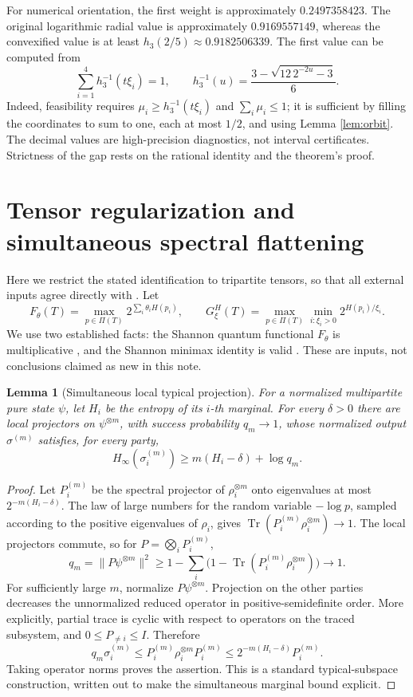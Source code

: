 \documentclass[11pt,a4paper]{article}
\newtheorem{lemma}[theorem]{Lemma}
\newcommand{\Tr}{\operatorname{Tr}}
\newcommand{\Hinf}{H_{\infty}}
\begin{document}
For numerical orientation, the first weight is approximately
\(0.2497358423\). The original logarithmic radial value is
approximately \(0.9169557149\), whereas the convexified value is
at least \(h_3(2/5)\approx0.9182506339\).
The first value can be computed from
\[
 \sum_{i=1}^4 h_3^{-1}(t\xi_i)=1,
 \qquad h_3^{-1}(u)=\frac{3-\sqrt{12\,2^{-2u}-3}}6.
\]
Indeed, feasibility requires \(\mu_i\ge h_3^{-1}(t\xi_i)\) and
\(\sum_i\mu_i\le1\); it is sufficient by filling the coordinates
to sum to one, each at most \(1/2\), and using Lemma \ref{lem:orbit}.
The decimal values are high-precision diagnostics, not interval
certificates. Strictness of the gap rests on the rational identity
and the theorem's proof.

\section{Tensor regularization and simultaneous spectral flattening}
Here we restrict the stated identification to tripartite tensors,
so that all external inputs agree directly with \cite{CLZ,CVZ}.
Let
\[
 F_\theta(T)=\max_{p\in\Pi(T)}2^{\sum_i\theta_iH(p_i)},\qquad
 G_\xi^{H}(T)=\max_{p\in\Pi(T)}\min_{i:\xi_i>0}2^{H(p_i)/\xi_i}.
\]
We use two established facts: the Shannon quantum functional
\(F_\theta\) is multiplicative \cite[Theorem 3.30 and Corollary 3.31]{CVZ}, and the Shannon minimax
identity is valid \cite{CLZ}. These are inputs, not conclusions
claimed as new in this note.

\begin{lemma}[Simultaneous local typical projection]\label{lem:typical}
For a normalized multipartite pure state \(\psi\), let \(H_i\)
be the entropy of its \(i\)-th marginal. For every \(\delta>0\)
there are local projectors on \(\psi^{\otimes m}\), with success
probability \(q_m\to1\), whose normalized output \(\sigma^{(m)}\)
satisfies, for every party,
\[
 \Hinf(\sigma_i^{(m)})\ge m(H_i-\delta)+\log q_m.
 \label{eq:flatten}
\]
\end{lemma}
\begin{proof}
Let \(P_i^{(m)}\) be the spectral projector of \(\rho_i^{\otimes m}\)
onto eigenvalues at most \(2^{-m(H_i-\delta)}\).
The law of large numbers for the random variable \(-\log p\), sampled
according to the positive eigenvalues of \(\rho_i\), gives
\(\Tr(P_i^{(m)}\rho_i^{\otimes m})\to1\).
The local projectors commute, so for \(P=\bigotimes_iP_i^{(m)}\),
\[
 q_m=\|P\psi^{\otimes m}\|^2
 \ge1-\sum_i\bigl(1-\Tr(P_i^{(m)}\rho_i^{\otimes m})\bigr)\to1.
\]
For sufficiently large \(m\), normalize \(P\psi^{\otimes m}\).
Projection on the other parties decreases the unnormalized reduced
operator in positive-semidefinite order. More explicitly, partial
trace is cyclic with respect to operators on the traced subsystem,
and \(0\le P_{\ne i}\le I\). Therefore
\[
 q_m\sigma_i^{(m)}
 \le P_i^{(m)}\rho_i^{\otimes m}P_i^{(m)}
 \le 2^{-m(H_i-\delta)}P_i^{(m)}.
\]
Taking operator norms proves the assertion. This is a standard
typical-subspace construction, written out to make the simultaneous
marginal bound explicit.
\end{proof}
\end{document}
